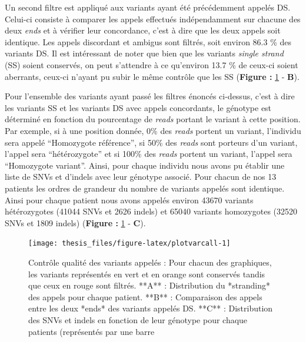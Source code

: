 \documentclass[12pt,twoside]{reedthesis}
\theoremstyle{definition}
\theoremstyle{definition}
\theoremstyle{remark}
\begin{document}
  Un second filtre est appliqué aux variants ayant été précédemment
  appelés DS. Celui-ci consiste à comparer les appels effectués
  indépendamment sur chacune des deux \emph{ends} et à vérifier leur
  concordance, c'est à dire que les deux appels soit identique. Les appels
  discordant et ambigus sont filtrés, soit environ 86.3 \% des variants
  DS. Il est intéressant de noter que bien que les variants \emph{single
  strand} (SS) soient conservés, on peut s'attendre à ce qu'environ 13.7
  \% de ceux-ci soient aberrants, ceux-ci n'ayant pu subir le même
  contrôle que les SS (\textbf{Figure : }\ref{fig:plotvarcall} -
  \textbf{B}).
  
  Pour l'ensemble des variants ayant passé les filtres énoncés ci-dessus,
  c'est à dire les variants SS et les variants DS avec appels concordants,
  le génotype est déterminé en fonction du pourcentage de \emph{reads}
  portant le variant à cette position. Par exemple, si à une position
  donnée, 0\% des \emph{reads} portent un variant, l'individu sera appelé
  ``Homozygote référence'', si 50\% des \emph{reads} sont porteurs d'un
  variant, l'appel sera ``hétérozygote'' et si 100\% des \emph{reads}
  portent un variant, l'appel sera ``Homozygote variant''. Ainsi, pour
  chaque individu nous avons pu établir une liste de SNVs et d'indels avec
  leur génotype associé. Pour chacun de nos 13 patients les ordres de
  grandeur du nombre de variants appelés sont identique. Ainsi pour chaque
  patient nous avons appelés environ 43670 variants hétérozygotes (41044
  SNVs et 2626 indels) et 65040 variants homozygotes (32520 SNVs et 1809
  indels) (\textbf{Figure : }\ref{fig:plotvarcall} - \textbf{C}).
  
  \newpage
  
  \begin{figure}
  
  {\centering \texttt{[image: thesis\_files/figure-latex/plotvarcall-1]} 
  
  }
  
  \caption[Contrôle qualité des variants appelés]{Contrôle qualité des variants appelés : Pour chacun des graphiques, les variants représentés en vert et en orange sont conservés tandis que ceux en rouge sont filtrés. **A** : Distribution du *stranding* des appels pour chaque patient. **B** : Comparaison des appels entre les deux *ends* des variants appelés DS. **C** : Distribution des SNVs et indels en fonction de leur génotype pour chaque patients (représentés par une barre}\label{fig:plotvarcall}
  \end{figure}
  
\end{document}
